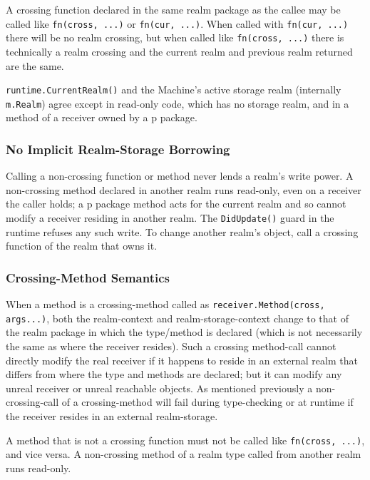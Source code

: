 \documentclass[12pt,a4paper]{article}
\newcommand{\passthrough}[1]{#1}
\begin{document}
A crossing function declared in the same realm package as the callee may
be called like \passthrough{\lstinline!fn(cross, ...)!} or
\passthrough{\lstinline!fn(cur, ...)!}. When called with
\passthrough{\lstinline!fn(cur, ...)!} there will be no realm crossing,
but when called like \passthrough{\lstinline!fn(cross, ...)!} there is
technically a realm crossing and the current realm and previous realm
returned are the same.

\passthrough{\lstinline!runtime.CurrentRealm()!} and the Machine's
active storage realm (internally \passthrough{\lstinline!m.Realm!})
agree except in read-only code, which has no storage realm, and in a
method of a receiver owned by a p package.

\subsubsection{No Implicit Realm-Storage
Borrowing}\label{implicit-realm-storage-borrowing}

Calling a non-crossing function or method never lends a realm's write
power. A non-crossing method declared in another realm runs read-only,
even on a receiver the caller holds; a p package method acts for the
current realm and so cannot modify a receiver residing in another realm.
The \passthrough{\lstinline!DidUpdate()!} guard in the runtime refuses
any such write. To change another realm's object, call a crossing
function of the realm that owns it.

\subsubsection{Crossing-Method
Semantics}\label{crossing-method-semantics}

When a method is a crossing-method called as
\passthrough{\lstinline!receiver.Method(cross, args...)!}, both the
realm-context and realm-storage-context change to that of the realm
package in which the type/method is declared (which is not necessarily
the same as where the receiver resides). Such a crossing method-call
cannot directly modify the real receiver if it happens to reside in an
external realm that differs from where the type and methods are
declared; but it can modify any unreal receiver or unreal reachable
objects. As mentioned previously a non-crossing-call of a
crossing-method will fail during type-checking or at runtime if the
receiver resides in an external realm-storage.

A method that is not a crossing function must not be called like
\passthrough{\lstinline!fn(cross, ...)!}, and vice versa. A non-crossing
method of a realm type called from another realm runs read-only.
\end{document}

